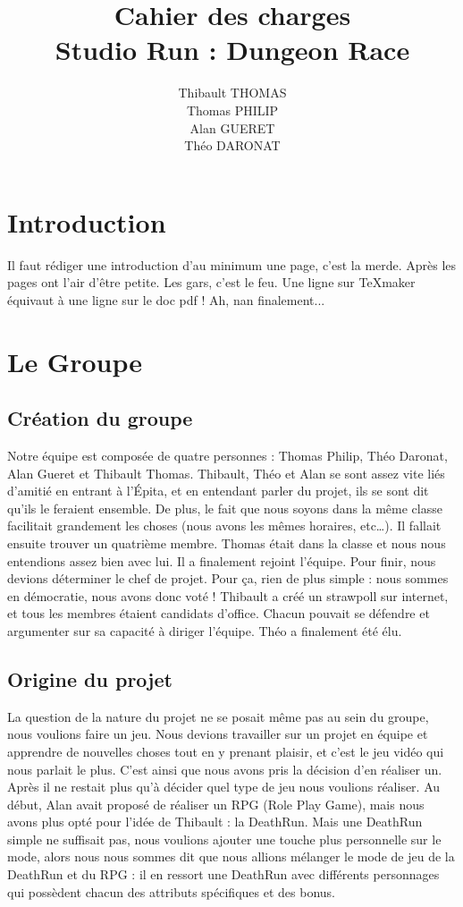 \documentclass[12pt]{report}
\title{\LARGE Cahier des charges \\ \large Studio Run : Dungeon Race}
\date{}
\author{\small Thibault THOMAS \\ \small Thomas PHILIP \\ \small Alan GUERET \\ \small Théo DARONAT}
\begin{document}
\maketitle
\tableofcontents

\pagebreak
\chapter{Introduction}
Il faut rédiger une introduction d'au minimum une page, c'est la merde. Après les pages ont l'air d'être petite. Les gars, c'est le feu. Une ligne sur TeXmaker équivaut à une ligne sur le doc pdf ! Ah, nan finalement...
\chapter{Le Groupe}
	
	\section{Création du groupe}
	Notre équipe est composée de quatre personnes : Thomas Philip, Théo Daronat, Alan Gueret et Thibault Thomas. 
Thibault, Théo et Alan se sont assez vite liés d'amitié en entrant à l'\'Epita, et en entendant parler du projet, ils se sont dit qu'ils le feraient ensemble. De plus, le fait que nous soyons dans la même classe facilitait grandement les choses (nous avons les mêmes horaires, etc…). Il fallait ensuite trouver un quatrième membre. Thomas était dans la classe et nous nous entendions assez bien avec lui. Il a finalement rejoint l'équipe. 
Pour finir, nous devions déterminer le chef de projet. Pour ça, rien de plus simple : nous sommes en démocratie, nous avons donc voté ! Thibault a créé un strawpoll sur internet, et tous les membres étaient candidats d'office. Chacun pouvait se défendre et argumenter sur sa capacité à diriger l'équipe. Théo a finalement été élu. 


	\section{Origine du projet}
	La question de la nature du projet ne se posait même pas au sein du groupe, nous voulions faire un jeu. Nous devions travailler sur un projet en équipe et apprendre de nouvelles choses tout en y prenant plaisir, et c'est le jeu vidéo qui nous parlait le plus. C'est ainsi que nous avons pris la décision d'en réaliser un. Après il ne restait plus qu'à décider quel type de jeu nous voulions réaliser. Au début, Alan avait proposé de réaliser un RPG (Role Play Game), mais nous avons plus opté pour l'idée de Thibault : la DeathRun. Mais une DeathRun simple ne suffisait pas, nous voulions ajouter une touche plus personnelle sur le mode, alors nous nous sommes dit que nous allions mélanger le mode de jeu de la DeathRun et du RPG : il en ressort une DeathRun avec différents personnages qui possèdent chacun des attributs spécifiques et des bonus.
	
\end{document}
